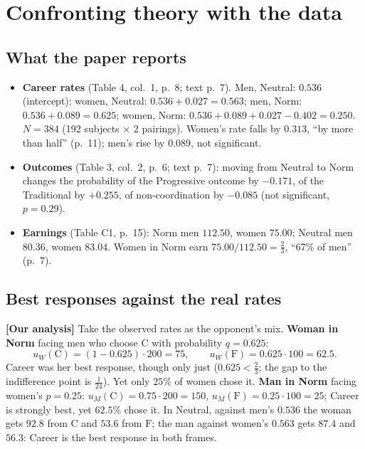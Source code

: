 \documentclass[11pt,a4paper]{article}
\newcommand{\ours}{\textcolor{warn}{\textbf{[Our analysis]}}}
\newcommand{\C}{\mathrm{C}}
\newcommand{\Fm}{\mathrm{F}}
\begin{document}
\section{Confronting theory with the data}

\subsection{What the paper reports}
\begin{itemize}
  \item \textbf{Career rates} (Table 4, col.~1, p.~8; text p.~7). Men, Neutral: $0.536$ (intercept);
    women, Neutral: $0.536+0.027=0.563$; men, Norm: $0.536+0.089=0.625$; women, Norm:
    $0.536+0.089+0.027-0.402=0.250$. $N=384$ (192 subjects $\times$ 2 pairings).
    Women's rate falls by $0.313$, ``by more than half'' (p.~11); men's rise by $0.089$, not significant.
  \item \textbf{Outcomes} (Table 3, col.~2, p.~6; text p.~7): moving from Neutral to Norm changes the
    probability of the Progressive outcome by $-0.171$, of the Traditional by $+0.255$, of
    non-coordination by $-0.085$ (not significant, $p=0.29$).
  \item \textbf{Earnings} (Table C1, p.~15): Norm men $112.50$, women $75.00$; Neutral men
    $80.36$, women $83.04$. Women in Norm earn $75.00/112.50=\tfrac23$, ``67\% of men'' (p.~7).
\end{itemize}

\subsection{Best responses against the real rates}
\ours{} Take the observed rates as the opponent's mix.
\textbf{Woman in Norm} facing men who choose $\C$ with probability $q=0.625$:
\[
u_W(\C)=(1-0.625)\cdot200=75,\qquad u_W(\Fm)=0.625\cdot100=62.5 .
\]
Career was her best response, though only just ($0.625<\tfrac23$; the gap to the indifference point
is $\tfrac1{24}$). Yet only $25\%$ of women chose it. \textbf{Man in Norm} facing women's $p=0.25$:
$u_M(\C)=0.75\cdot200=150$, $u_M(\Fm)=0.25\cdot100=25$; Career is strongly best, yet $62.5\%$ chose
it. In Neutral, against men's $0.536$ the woman gets $92.8$ from $\C$ and $53.6$ from $\Fm$; the
man against women's $0.563$ gets $87.4$ and $56.3$: Career is the best response in both
frames.
\end{document}
